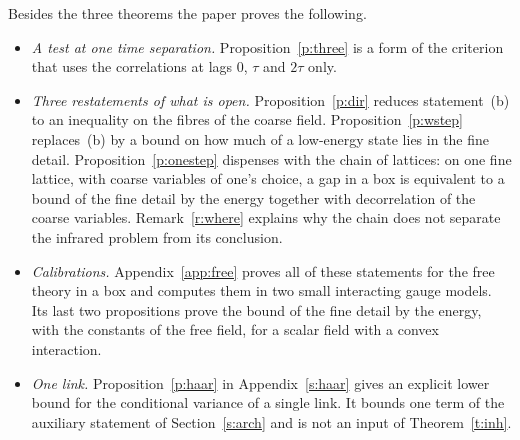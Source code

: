 Besides the three theorems the paper proves the following.
\begin{itemize}
\item \emph{A test at one time separation.} Proposition~\ref{p:three} is a form of the criterion that uses
the correlations at lags $0$, $\tau$ and $2\tau$ only.
\item \emph{Three restatements of what is open.} Proposition~\ref{p:dir} reduces statement~(b) to an
inequality on the fibres of the coarse field. Proposition~\ref{p:wstep} replaces~(b) by a bound on how much
of a low-energy state lies in the fine detail. Proposition~\ref{p:onestep} dispenses with the chain of
lattices: on one fine lattice, with coarse variables of one's choice, a gap in a box is equivalent to a
bound of the fine detail by the energy together with decorrelation of the coarse variables.
Remark~\ref{r:where} explains why the chain does not separate the infrared problem from its conclusion.
\item \emph{Calibrations.} Appendix~\ref{app:free} proves all of these statements for the free theory in a
box and computes them in two small interacting gauge models. Its last two propositions prove the bound of
the fine detail by the energy, with the constants of the free field, for a scalar field with a convex
interaction.
\item \emph{One link.} Proposition~\ref{p:haar} in Appendix~\ref{s:haar} gives an explicit lower bound for
the conditional variance of a single link. It bounds one term of the auxiliary statement of
Section~\ref{s:arch} and is not an input of Theorem~\ref{t:inh}.
\end{itemize}


